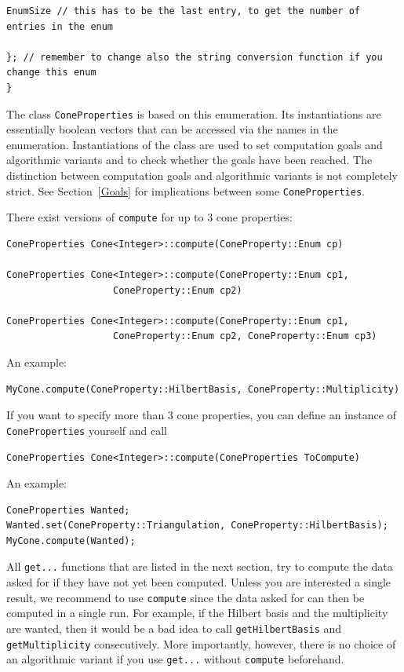 \begin{small}
\begin{Verbatim}
EnumSize // this has to be the last entry, to get the number of entries in the enum

}; // remember to change also the string conversion function if you change this enum
}
\end{Verbatim}

The class \verb|ConeProperties| is based on this enumeration. Its instantiations are essentially boolean vectors that can be accessed via the names in the enumeration. Instantiations of the class are used to set computation goals and algorithmic variants and to check whether the goals have been reached. The distinction between computation goals and algorithmic variants is not completely strict. See Section~\ref{Goals} for implications between some \verb|ConeProperties|.

There exist versions of \verb|compute| for up to $3$ cone properties:
\begin{Verbatim}
ConeProperties Cone<Integer>::compute(ConeProperty::Enum cp)

ConeProperties Cone<Integer>::compute(ConeProperty::Enum cp1, 
                   ConeProperty::Enum cp2)

ConeProperties Cone<Integer>::compute(ConeProperty::Enum cp1, 
                   ConeProperty::Enum cp2, ConeProperty::Enum cp3)
\end{Verbatim}

An example:
\begin{Verbatim}
MyCone.compute(ConeProperty::HilbertBasis, ConeProperty::Multiplicity)
\end{Verbatim}

If you want to specify more than $3$ cone properties, you can define an instance of \verb|ConeProperties| yourself and call
\begin{Verbatim}
ConeProperties Cone<Integer>::compute(ConeProperties ToCompute)
\end{Verbatim}

An example:
\begin{Verbatim}
ConeProperties Wanted;
Wanted.set(ConeProperty::Triangulation, ConeProperty::HilbertBasis);
MyCone.compute(Wanted);
\end{Verbatim}

All \verb|get...| functions that are listed in the next section, try to compute the data asked for if they have not yet been computed. Unless you are interested a single result, we recommend to use \verb|compute| since the data asked for can then be computed in a single run. For example, if the Hilbert basis and the multiplicity are wanted, then it would be a bad idea to call \verb|getHilbertBasis| and \verb|getMultiplicity| consecutively. More importantly, however, there is no choice of an algorithmic variant if you use \verb|get...| without \verb|compute| beforehand.


\end{small}
